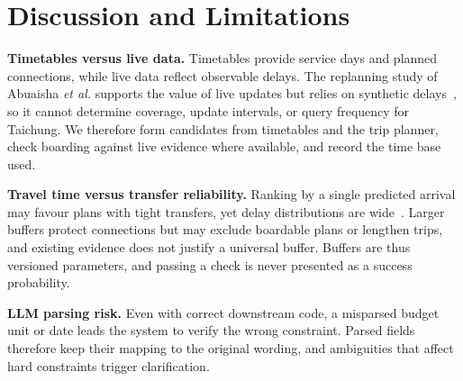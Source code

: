 \documentclass[conference]{IEEEtran}
\begin{document}

\section{Discussion and Limitations}\label{sec:discussion}

\textbf{Timetables versus live data.} Timetables provide service days and planned connections, while live data reflect observable delays. The replanning study of Abuaisha \emph{et al.} supports the value of live updates but relies on synthetic delays~\cite{bus_dynamic_replanning}, so it cannot determine coverage, update intervals, or query frequency for Taichung. We therefore form candidates from timetables and the trip planner, check boarding against live evidence where available, and record the time base used.

\textbf{Travel time versus transfer reliability.} Ranking by a single predicted arrival may favour plans with tight transfers, yet delay distributions are wide~\cite{bus_delay_uncertainty}. Larger buffers protect connections but may exclude boardable plans or lengthen trips, and existing evidence does not justify a universal buffer. Buffers are thus versioned parameters, and passing a check is never presented as a success probability.

\textbf{LLM parsing risk.} Even with correct downstream code, a misparsed budget unit or date leads the system to verify the wrong constraint. Parsed fields therefore keep their mapping to the original wording, and ambiguities that affect hard constraints trigger clarification.
\end{document}

